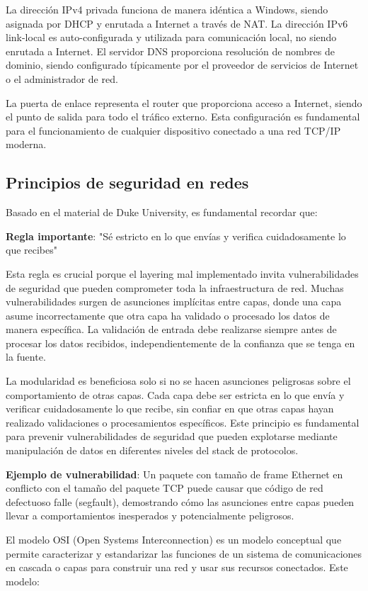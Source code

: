 \begin{itemize}
La dirección IPv4 privada funciona de manera idéntica a Windows, siendo asignada por DHCP y enrutada a Internet a través de NAT. La dirección IPv6 link-local es auto-configurada y utilizada para comunicación local, no siendo enrutada a Internet. El servidor DNS proporciona resolución de nombres de dominio, siendo configurado típicamente por el proveedor de servicios de Internet o el administrador de red.

La puerta de enlace representa el router que proporciona acceso a Internet, siendo el punto de salida para todo el tráfico externo. Esta configuración es fundamental para el funcionamiento de cualquier dispositivo conectado a una red TCP/IP moderna.

\subsection{Principios de seguridad en redes}

Basado en el material de Duke University, es fundamental recordar que:

\textbf{Regla importante}: "Sé estricto en lo que envías y verifica cuidadosamente lo que recibes"

Esta regla es crucial porque el layering mal implementado invita vulnerabilidades de seguridad que pueden comprometer toda la infraestructura de red. Muchas vulnerabilidades surgen de asunciones implícitas entre capas, donde una capa asume incorrectamente que otra capa ha validado o procesado los datos de manera específica. La validación de entrada debe realizarse siempre antes de procesar los datos recibidos, independientemente de la confianza que se tenga en la fuente.

La modularidad es beneficiosa solo si no se hacen asunciones peligrosas sobre el comportamiento de otras capas. Cada capa debe ser estricta en lo que envía y verificar cuidadosamente lo que recibe, sin confiar en que otras capas hayan realizado validaciones o procesamientos específicos. Este principio es fundamental para prevenir vulnerabilidades de seguridad que pueden explotarse mediante manipulación de datos en diferentes niveles del stack de protocolos.

\textbf{Ejemplo de vulnerabilidad}: Un paquete con tamaño de frame Ethernet en conflicto con el tamaño del paquete TCP puede causar que código de red defectuoso falle (segfault), demostrando cómo las asunciones entre capas pueden llevar a comportamientos inesperados y potencialmente peligrosos.

El modelo OSI (Open Systems Interconnection) es un modelo conceptual que permite caracterizar y estandarizar las funciones de un sistema de comunicaciones en cascada o capas para construir una red y usar sus recursos conectados. Este modelo:


\end{itemize}
